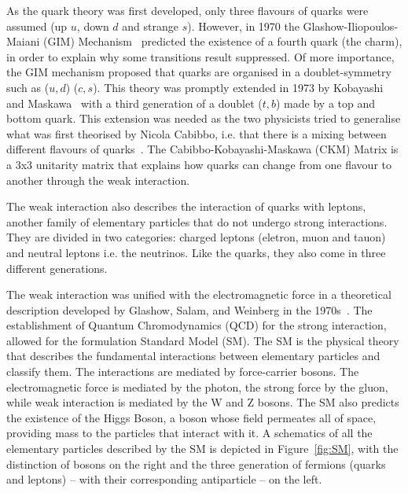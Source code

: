 As the quark theory was first developed, only three flavours of quarks were assumed (up $u$, down $d$ and strange $s$). However, in 1970 the Glashow-Iliopoulos-Maiani (GIM) Mechanism~\cite{Glashow:1970gm} predicted the existence of a fourth quark (the charm), in order to explain why some transitions result suppressed. Of more importance, the GIM mechanism proposed that quarks are organised in a doublet-symmetry such as ($u,d$) ($c,s$). This theory was promptly extended in 1973 by Kobayashi and Maskawa~\cite{Kobayashi:1973fv} with a third generation of a doublet ($t,b$) made by a top and bottom quark. This extension was needed as the two physicists tried to generalise what was first theorised by Nicola Cabibbo, i.e. that there is a mixing between different flavours of quarks~\cite{Cabibbo:1963yz}. The Cabibbo-Kobayashi-Maskawa (CKM) Matrix is a 3x3 unitarity matrix that explains how quarks can change from one flavour to another through the weak interaction. 

The weak interaction also describes the interaction of quarks with leptons, another family of elementary particles that do not undergo strong interactions. They are divided in two categories: charged leptons (eletron, muon and tauon) and neutral leptons i.e. the neutrinos. Like the quarks, they also come in three different generations.  

The weak interaction was unified with the electromagnetic force in a theoretical description developed by Glashow, Salam, and Weinberg in the 1970s~\cite{Glashow:1961tr, Weinberg:1967tq, Salam:1968rm, Georgi:1974sy}. The establishment of Quantum Chromodynamics (QCD) for the strong interaction, allowed for the formulation Standard Model (SM). The SM is the physical theory that describes the fundamental interactions between elementary particles and classify them. The interactions are mediated by force-carrier bosons. The electromagnetic force is mediated by the photon, the strong force by the gluon, while weak interaction is mediated by the W and Z bosons. The SM also predicts the existence of the Higgs Boson, a boson whose field permeates all of space, providing mass to the particles that interact with it. A schematics of all the elementary particles described by the SM is depicted in Figure~\ref{fig:SM}, with the distinction of bosons on the right and the three generation of fermions (quarks and leptons) -- with their corresponding antiparticle -- on the left. 


